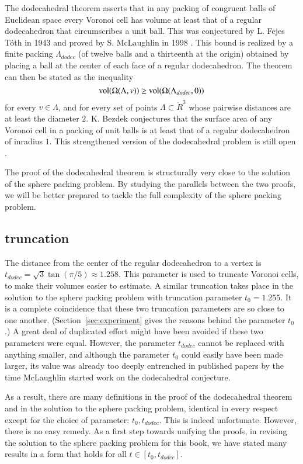The dodecahedral theorem asserts that in any packing of congruent balls of Euclidean
space every Voronoi cell has volume at least that of a regular dodecahedron that
circumscribes a unit ball.  This was conjectured by L. Fejes T\'oth in 1943 and proved
by S. McLaughlin in 1998 \cite{McL98}.  This bound is realized by a finite 
packing $\Lambda_{dodec}$
(of twelve balls and a thirteenth  at the origin) obtained
by placing a ball at the center of each face of a regular dodecahedron.  The
theorem can then be stated as the inequality
  $$
  {\operatorname{vol}}(\Omega(\Lambda,v)) \ge {\operatorname{vol}}(\Omega(\Lambda_{dodec},0))
  $$
for every $v\in\Lambda$, and for every set of points $\Lambda\subset \ring{R}^3$
whose pairwise distances are at least the diameter $2$.
K. Bezdek conjectures that the surface area of any Voronoi cell in a packing
of unit balls is at least that of a regular dodecahedron of inradius $1$.
This strengthened version of the dodecahedral problem is still
open \cite{Bez04}.

The proof of the dodecahedral theorem is structurally very close to the solution of
the sphere packing problem.  By studying the parallels between the two proofs, we 
will be better prepared to tackle the full complexity of the sphere packing problem.

\subsection{truncation}

The distance from the center of the regular dodecahedron to a vertex is
$t_{dodec}=\sqrt{3}\tan(\pi/5)\approx 1.258$.   This parameter is used to truncate
Voronoi cells, to make their volumes easier to estimate.  A similar truncation
takes place in the solution to the sphere packing problem with truncation parameter
$t_0 = 1.255$.  It is a complete coincidence that these two truncation parameters 
are so close to one another.  (Section~\ref{sec:experiment} 
gives the reasons behind the parameter $t_0$.)  A great deal of duplicated effort
might have been avoided if these two parameters were equal.  However, the parameter
$t_{dodec}$ cannot be replaced with anything smaller, 
and although the parameter $t_0$ could 
easily have been made larger, 
its value was already too deeply entrenched in published papers 
by the time McLaughlin started work
on the dodecahedral conjecture.

As a result, there are many definitions in the proof of the dodecahedral theorem
and in the solution to the sphere packing problem, identical in every respect except
for the choice of parameter: $t_0,t_{dodec}$.  This is indeed unfortunate.  However,
there is no easy remedy.  As a first step towards unifying the proofs,
in revising the solution to the sphere packing problem for
this book, we have stated many results in a form that holds for all $t\in[t_0,t_{dodec}]$.

